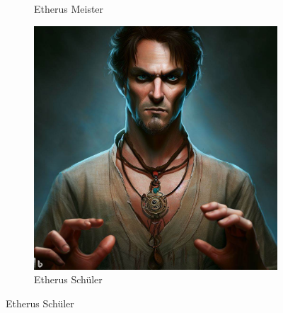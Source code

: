 \documentclass[11pt, twoside]{article}
\begin{document}
\begin{figure}[H]
\begin{subfigure}{0.3\textwidth}
    \caption{Etherus Meister}
  \end{subfigure}%
  \begin{subfigure}{0.3\textwidth}
    \centering
    \includegraphics[width=0.99\linewidth]{etheri3.jpeg}
    \caption{Etherus Schüler}
  \end{subfigure}
\end{figure}
\end{document}
